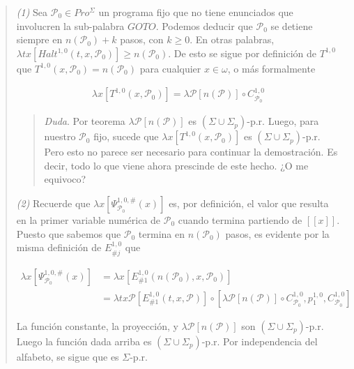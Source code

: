 \documentclass[a4paper, 12pt]{article}
\begin{document}
\pagebreak
\small
\begin{quote}


\textit{(1)} Sea $\mathcal{P}_0 \in Pro^{\Sigma}$ un programa fijo que
no tiene enunciados que involucren la sub-palabra $GOTO$. Podemos deducir que
$\mathcal{P}_0$ se detiene siempre en $n(\mathcal{P}_0) + k$ pasos, con $k \geq
0$. En otras palabras, $\lambda tx \left[ Halt^{1, 0}(t, x, \mathcal{P}_0)
\right] \geq n(\mathcal{P}_0)$. De esto se sigue por definición de $T^{1, 0}$ que $T^{1, 0}(x,
\mathcal{P}_0) = n(\mathcal{P}_0)$ para cualquier $x \in  \omega$, o más
formalmente

\begin{align*}
    \lambda x \left[ T^{1, 0}(x, \mathcal{P}_0)  \right] = 
    \lambda \mathcal{P} \left[ n(\mathcal{P})  \right] \circ
    C_{\mathcal{P}_0}^{1, 0}
\end{align*}

\begin{quote}
    \textit{Duda}. Por teorema $\lambda \mathcal{P} \left[ n(\mathcal{P})
    \right]$ es $(\Sigma \cup \Sigma_p)$-p.r. Luego, para nuestro
    $\mathcal{P}_0$ fijo, sucede que $\lambda x \left[ T^{1, 0} (x,
    \mathcal{P}_0)  \right]$ es $(\Sigma \cup \Sigma_p)$-p.r. Pero esto no
    parece ser necesario para continuar la demostración. Es decir, todo lo que
    viene ahora prescinde de este hecho. ¿O me equivoco?
\end{quote}

\textit{(2)} Recuerde que $\lambda x \left[  \Psi_{\mathcal{P}_0}^{1, 0, \#}(x) \right]$ es, por definición,
el valor que resulta en la primer variable numérica de $\mathcal{P}_0$ cuando
termina partiendo de $[\![ x ]\!]$. Puesto que sabemos que
$\mathcal{P}_0$ termina en $n(\mathcal{P}_0)$ pasos, es evidente por la misma
definición de $E_{\# j}^{1, 0}$ que

\begin{align*}
    \lambda x \left[ \Psi_{\mathcal{P}_0}^{1, 0, \#}(x)  \right] &= \lambda x
    \left[ E_{\#  1}^{1, 0}(n(\mathcal{P}_0), x, \mathcal{P}_0)  \right] \\ 
            &= \lambda tx\mathcal{P} \left[ E_{\# 1}^{1, 0}(t, x, \mathcal{P})
            \right] \circ \left[ \lambda \mathcal{P} \left[ n(\mathcal{P})
            \right] \circ C_{\mathcal{P}_0}^{1, 0}, p_1^{1, 0},
        C_{\mathcal{P}_0}^{1, 0} \right] 
\end{align*}

La función constante, la proyección, y $\lambda \mathcal{P} \left[
n(\mathcal{P})  \right]$ son $(\Sigma \cup  \Sigma_p)$-p.r. Luego la función
dada arriba  es $(\Sigma \cup \Sigma_p)$-p.r. Por independencia del
alfabeto, se sigue que es $\Sigma$-p.r.


\end{quote}
\end{document}
